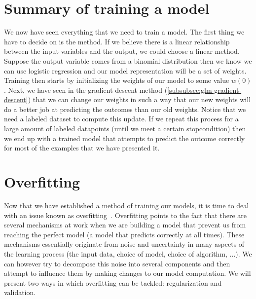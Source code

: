 \section{Summary of training a model}
We now have seen everything that we need to train a model. The first thing we have to decide on is the method. If we believe there is a linear relationship between the input variables and the output, we could choose a linear method. Suppose the output variable comes from a binomial distribution then we know we can use logistic regression and our model representation will be a set of weights. Training then starts by initializing the weights of our model to some value $w(0)$. Next, we have seen in the gradient descent method (\ref{subsubsec:glm-gradient-descent}) that we can change our weights in such a way that our new weights will do a better job at predicting the outcomes than our old weights. Notice that we need a labeled dataset to compute this update. If we repeat this process for a large amount of labeled datapoints (until we meet a certain stopcondition) then we end up with a trained model that attempts to predict the outcome correctly for most of the examples that we have presented it.
\section{Overfitting}
\label{sec:glm-overfitting}
Now that we have established a method of training our models, it is time to deal with an issue known as overfitting~\cite{caltechmachinelearning}\cite{babyak2004you}. Overfitting points to the fact that there are several mechanisms at work when we are building a model that prevent us from reaching the perfect model (a model that predicts correctly at all times). These mechanisms essentially originate from noise and uncertainty in many aspects of the learning process (the input data, choice of model, choice of algorithm, ...). We can however try to decompose this noise into several components and then attempt to influence them by making changes to our model computation. We will present two ways in which overfitting can be tackled: regularization and validation.

